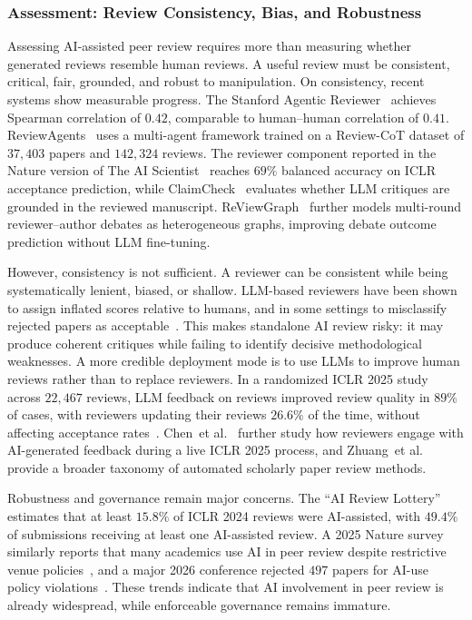 \documentclass{llmxive}
\providecommand{\etal}{et al.\xspace}
\begin{document}
\subsubsection{Assessment: Review Consistency, Bias, and Robustness}

\label{sec:review_quality}

Assessing AI-assisted peer review requires more than measuring whether generated reviews resemble human reviews. A useful review must be consistent, critical, fair, grounded, and robust to manipulation. On consistency, recent systems show measurable progress. The Stanford Agentic Reviewer~\cite{stanfordreviewer2025} achieves Spearman correlation of $0.42$, comparable to human--human correlation of $0.41$. ReviewAgents~\cite{reviewagents2025} uses a multi-agent framework trained on a Review-CoT dataset of $37{,}403$ papers and $142{,}324$ reviews. The reviewer component reported in the Nature version of The AI Scientist~\cite{aiscientistnature2026} reaches $69\%$ balanced accuracy on ICLR acceptance prediction, while ClaimCheck~\cite{claimcheck2025} evaluates whether LLM critiques are grounded in the reviewed manuscript. ReViewGraph~\cite{reviewgraph2025} further models multi-round reviewer--author debates as heterogeneous graphs, improving debate outcome prediction without LLM fine-tuning.

However, consistency is not sufficient. A reviewer can be consistent while being systematically lenient, biased, or shallow. LLM-based reviewers have been shown to assign inflated scores relative to humans, and in some settings to misclassify rejected papers as acceptable~\cite{llmreviewer2025}. This makes standalone AI review risky: it may produce coherent critiques while failing to identify decisive methodological weaknesses. A more credible deployment mode is to use LLMs to improve human reviews rather than to replace reviewers. In a randomized ICLR 2025 study across $22{,}467$ reviews, LLM feedback on reviews improved review quality in $89\%$ of cases, with reviewers updating their reviews $26.6\%$ of the time, without affecting acceptance rates~\cite{iclr2025reviewstudy}. Chen~\etal~\cite{reviewerfeedback2026} further study how reviewers engage with AI-generated feedback during a live ICLR 2025 process, and Zhuang~\etal~\cite{zhuang2025asprsurvey} provide a broader taxonomy of automated scholarly paper review methods.

Robustness and governance remain major concerns. The ``AI Review Lottery''~\cite{ailottery2024} estimates that at least $15.8\%$ of ICLR 2024 reviews were AI-assisted, with $49.4\%$ of submissions receiving at least one AI-assisted review. A 2025 Nature survey similarly reports that many academics use AI in peer review despite restrictive venue policies~\cite{aireviewsurvey2025}, and a major 2026 conference rejected $497$ papers for AI-use policy violations~\cite{aiuserejects2026}. These trends indicate that AI involvement in peer review is already widespread, while enforceable governance remains immature.
\end{document}
